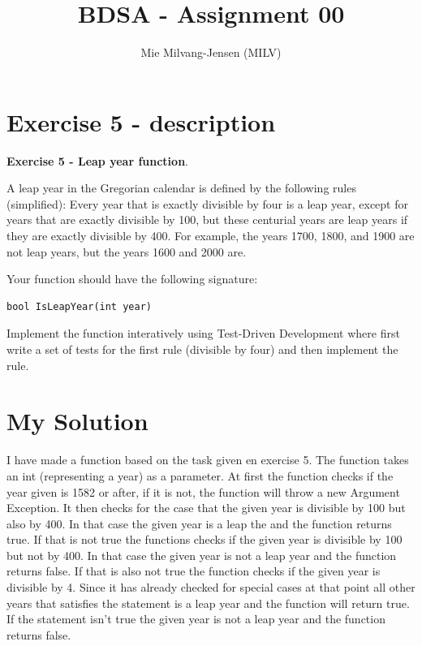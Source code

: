 \documentclass{article}
\title{BDSA - Assignment 00}
\author{Mie Milvang-Jensen (MILV)}
\begin{document}
\maketitle


\section{Exercise 5 - description}

\textbf{Exercise 5 - Leap year function}.

A leap year in the Gregorian calendar is defined by the following rules (simplified):
Every year that is exactly divisible by four is a leap year, except for years that are exactly divisible by 100, but these centurial years are leap years if they are exactly divisible by 400. For example, the years 1700, 1800, and 1900 are not leap years, but the years 1600 and 2000 are.

Your function should have the following signature:

\begin{verbatim}
bool IsLeapYear(int year)
\end{verbatim}

Implement the function interatively using Test-Driven Development where first write a set of tests for the first rule (divisible by four) and then implement the rule.

\section{My Solution}
I have made a function based on the task given en exercise 5. The function takes an int (representing a year) as a parameter. At first the function checks if the year given is 1582 or after, if it is not, the function will throw a new Argument Exception. It then checks for the case that the given year is divisible by 100 but also by 400. In that case the given year is a leap the and the function returns true. If that is not true the functions checks if the given year is divisible by 100 but not by 400. In that case the given year is not a leap year and the function returns false. If that is also not true the function checks if the given year is divisible by 4. Since it has already checked for special cases at that point all other years that satisfies the statement is a leap year and the function will return true. If the statement isn't true the given year is not a leap year and the function returns false. 
\end{document}
